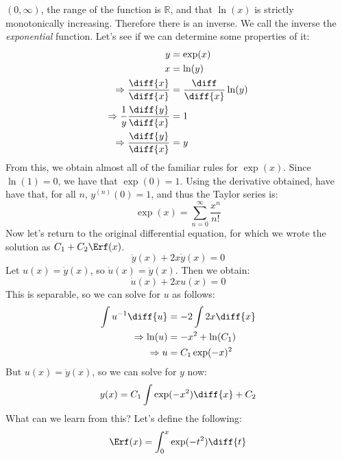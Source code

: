 \documentclass[crop=false,class=book,oneside]{standalone}
\begin{document}
        $(0,\infty)$, the range of the function is
        $\mathbb{R}$, and that $\ln(x)$ is strictly monotonically
        increasing. Therefore there is an inverse. We call the
        inverse the \textit{exponential} function. Let's see
        if we can determine some properties of it:
        \begin{align}
            y&=\exp(x)\\
            x&=\ln(y)\\
            \Rightarrow\frac{\diff{x}}{\diff{x}}
            &=\frac{\diff}{\diff{x}}\ln(y)\\
            \Rightarrow\frac{1}{y}\frac{\diff{y}}{\diff{x}}&=1\\
            \Rightarrow\frac{\diff{y}}{\diff{x}}&=y
        \end{align}
        From this, we obtain almost all of the familiar rules for
        $\exp(x)$. Since $\ln(1)=0$, we have that $\exp(0)=1$.
        Using the derivative obtained, have have that, for all
        $n$, $y^{(n)}(0)=1$, and thus the Taylor series is:
        \begin{equation}
            \exp(x)=\sum_{n=0}^{\infty}\frac{x^{n}}{n!}
        \end{equation}
        Now let's return to the original differential equation,
        for which we wrote the solution as $C_{1}+C_{2}\Erf(x)$.
        \begin{equation}
            \ddot{y}(x)+2x\dot{y}(x)=0
        \end{equation}
        Let $u(x)=\dot{y}(x)$, so $\dot{u}(x)=\ddot{y}(x)$.
        Then we obtain:
        \begin{equation}
            \dot{u}(x)+2xu(x)=0
        \end{equation}
        This is separable, so we can solve for $u$ as follows:
        \begin{align}
            \int{u}^{-1}\diff{u}
            &=-2\int{2x}\diff{x}\\
            \Rightarrow\ln(u)&=-x^{2}+\ln(C_{1})\\
            \Rightarrow{u}&=C_{1}\exp(-x)^{2}
        \end{align}
        But $u(x)=\dot{y}(x)$, so we can solve for $y$ now:
        \begin{equation}
            y(x)=C_{1}\int\exp(-x^{2})\diff{x}+C_{2}
        \end{equation}
        What can we learn from this? Let's define the following:
        \begin{equation}
            \Erf(x)=\int_{0}^{x}\exp(-t^{2})\diff{t}
        \end{equation}
\end{document}
